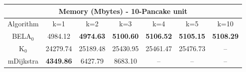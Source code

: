 \begin{tabular}{c|cccccc}\toprule
\multicolumn{7}{c}{Memory (Mbytes) - 10-Pancake unit}\\ \midrule
Algorithm & k=1 & k=2 & k=3 & k=4 & k=5 & k=10 \\ \midrule
BELA$_0$ & 4984.12 & \textbf{4974.63} & \textbf{5100.60} & \textbf{5106.52} & \textbf{5105.15} & \textbf{5108.29} \\
K$_0$ & 24279.74 & 25189.48 & 25430.95 & 25461.47 & 25476.73 & -- \\
mDijkstra & \textbf{4349.86} & 6427.79 & 8683.10 & -- & -- & -- \\ \bottomrule 
\end{tabular}
